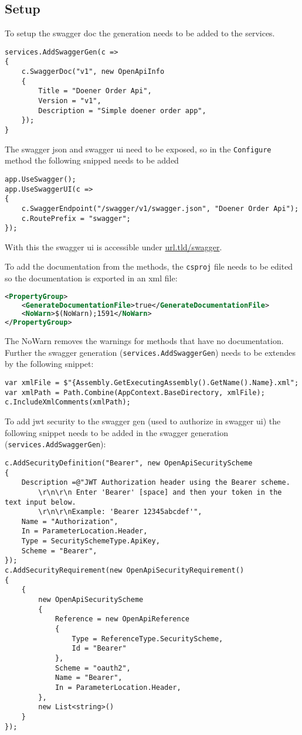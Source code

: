 \documentclass[12pt, a4paper]{article}
\begin{document}
\subsection{Setup}
To setup the swagger doc the generation needs to be added to the services. 
\begin{lstlisting}
services.AddSwaggerGen(c =>
{
	c.SwaggerDoc("v1", new OpenApiInfo
	{
		Title = "Doener Order Api",
		Version = "v1",
		Description = "Simple doener order app",
	});
}
\end{lstlisting}
The swagger json and swagger ui need to be exposed, so in the \lstinline|Configure| method the following snipped needs to be added 
\begin{lstlisting}
app.UseSwagger();
app.UseSwaggerUI(c =>
{
	c.SwaggerEndpoint("/swagger/v1/swagger.json", "Doener Order Api");
	c.RoutePrefix = "swagger";
});
\end{lstlisting}
With this the swagger ui is accessible under \href{url.tld/swagger}{url.tld/swagger}.

To add the documentation from the methods, the \lstinline|csproj| file needs to be edited so the documentation is exported in an xml file:
\begin{lstlisting}[language=XML]
<PropertyGroup>
	<GenerateDocumentationFile>true</GenerateDocumentationFile>
	<NoWarn>$(NoWarn);1591</NoWarn>
</PropertyGroup>
\end{lstlisting}
The NoWarn removes the warnings for methods that have no documentation. Further the swagger generation (\lstinline|services.AddSwaggerGen|) needs to be extendes by the following snippet:
\begin{lstlisting}
var xmlFile = $"{Assembly.GetExecutingAssembly().GetName().Name}.xml";
var xmlPath = Path.Combine(AppContext.BaseDirectory, xmlFile);
c.IncludeXmlComments(xmlPath);
\end{lstlisting}

To add jwt security to the swagger gen (used to authorize in swagger ui) the following snippet needs to be added in the swagger generation (\lstinline|services.AddSwaggerGen|):
\begin{lstlisting}
c.AddSecurityDefinition("Bearer", new OpenApiSecurityScheme
{
	Description =@"JWT Authorization header using the Bearer scheme. 
		\r\n\r\n Enter 'Bearer' [space] and then your token in the text input below. 
		\r\n\r\nExample: 'Bearer 12345abcdef'",
	Name = "Authorization",
	In = ParameterLocation.Header,
	Type = SecuritySchemeType.ApiKey,
	Scheme = "Bearer",
});
c.AddSecurityRequirement(new OpenApiSecurityRequirement()
{
	{
		new OpenApiSecurityScheme
		{
			Reference = new OpenApiReference
			{
				Type = ReferenceType.SecurityScheme,
				Id = "Bearer"
			},
			Scheme = "oauth2",
			Name = "Bearer",
			In = ParameterLocation.Header,
		},
		new List<string>()
	}
});
\end{lstlisting}
\end{document}

